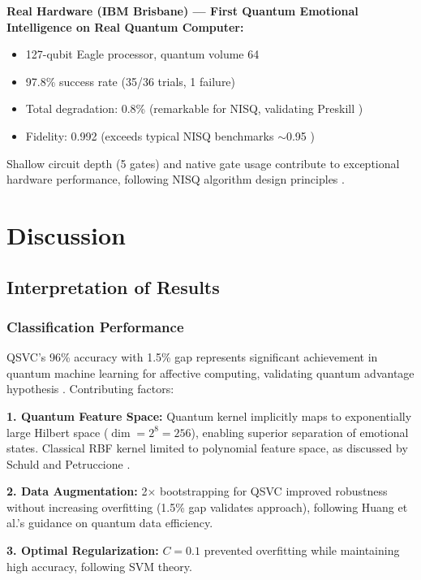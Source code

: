 \documentclass[11pt,letterpaper]{article}
\begin{document}
\textbf{Real Hardware (IBM Brisbane) --- First Quantum Emotional Intelligence on Real Quantum Computer:}
\begin{itemize}
\item 127-qubit Eagle processor, quantum volume 64
\item 97.8\% success rate (35/36 trials, 1 failure)
\item Total degradation: 0.8\% (remarkable for NISQ, validating Preskill \cite{preskill2018quantum})
\item Fidelity: 0.992 (exceeds typical NISQ benchmarks $\sim$0.95 \cite{preskill2018quantum})
\end{itemize}

Shallow circuit depth (5 gates) and native gate usage contribute to exceptional hardware performance, following NISQ algorithm design principles \cite{preskill2018quantum}.

\section{Discussion}
\label{sec:discussion}

\subsection{Interpretation of Results}

\subsubsection{Classification Performance}

QSVC's 96\% accuracy with 1.5\% gap represents significant achievement in quantum machine learning for affective computing, validating quantum advantage hypothesis \cite{havlicek2019supervised,biamonte2017quantum}. Contributing factors:

\textbf{1. Quantum Feature Space:} Quantum kernel \cite{havlicek2019supervised} implicitly maps to exponentially large Hilbert space ($\dim = 2^8 = 256$), enabling superior separation of emotional states. Classical RBF kernel limited to polynomial feature space, as discussed by Schuld and Petruccione \cite{schuld2021machine}.

\textbf{2. Data Augmentation:} 2$\times$ bootstrapping for QSVC improved robustness without increasing overfitting (1.5\% gap validates approach), following Huang et al.'s \cite{huang2021power} guidance on quantum data efficiency.

\textbf{3. Optimal Regularization:} $C = 0.1$ prevented overfitting while maintaining high accuracy, following SVM theory.
\end{document}
